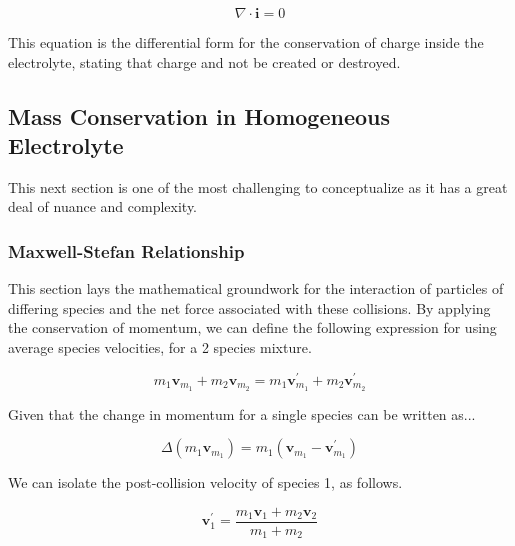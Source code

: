 \documentclass[lettersize,journal]{IEEEtran}
\begin{document}
\begin{equation}
  \nabla \cdot \mathbf{i}=0
\end{equation}

This equation is the differential form for the conservation of charge inside the electrolyte, stating that charge and not be created or destroyed.














\subsection{Mass Conservation in Homogeneous Electrolyte}



This next section is one of the most challenging to conceptualize as it has a great deal of nuance and complexity. \\

\subsubsection{Maxwell-Stefan Relationship}
This section lays the mathematical groundwork for the interaction of particles of differing species and the net force associated with these collisions. By applying the conservation of momentum, we can define the following expression for using average species velocities, for a 2 species mixture.

\begin{equation}
  m_{1} \mathbf{v}_{m_{1}}+m_{2} \mathbf{v}_{m_{2}}=m_{1} \mathbf{v}_{m_{1}}^{\prime}+m_{2} \mathbf{v}_{m_{2}}^{\prime}
\end{equation}

Given that the change in momentum for a single species can be written as...

\begin{equation}
  \Delta\left(m_{1} \mathbf{v}_{m_{1}}\right)=m_{1}\left(\mathbf{v}_{m_{1}}-\mathbf{v}_{m_{1}}^{\prime}\right)
\end{equation}

We can isolate the post-collision velocity of species 1, as follows.

\begin{equation}
  \mathbf{v}_{1}^{\prime}=\frac{m_{1} \mathbf{v}_{1}+m_{2} \mathbf{v}_{2}}{m_{1}+m_{2}}
\end{equation}
\end{document}
